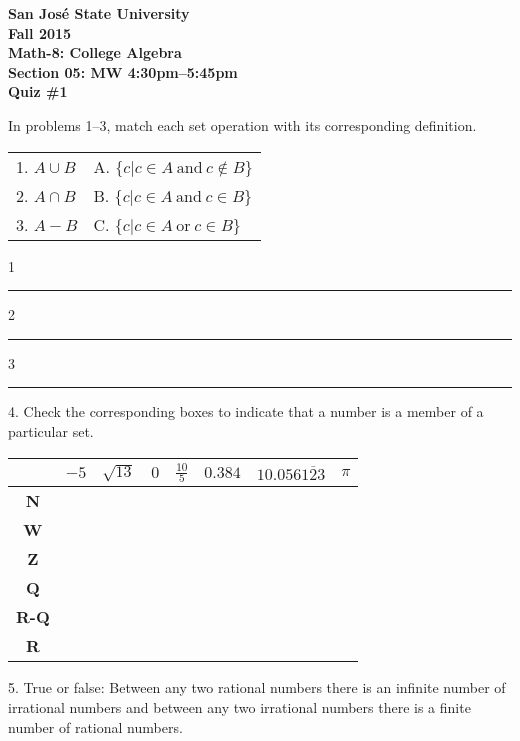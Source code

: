 \documentclass[letterpaper, 12pt]{article}
\begin{document}
\begin{center}
\bfseries
San Jos\'{e} State University \\
Fall 2015 \\
Math-8: College Algebra \\
Section 05: MW 4:30pm--5:45pm \\
\bigskip
Quiz \#1
\end{center}

\bigskip

In problems 1--3, match each set operation with its corresponding definition.

\bigskip

\begin{tabular}{p{2in}l}
1. $A \cup B$ & A. $\{c | c \in A\ \mbox{and}\ c \notin B\}$ \\
2. $A \cap B$ & B. $\{c | c \in A\ \mbox{and}\ c \in B\}$ \\
3. $A - B$ & C. $\{c | c \in A\ \mbox{or}\ c \in B\}$
\end{tabular}

\bigskip

1 \rule{1in}{1pt}

2 \rule{1in}{1pt}

3 \rule{1in}{1pt}

\vspace{0.5in}

4. Check the corresponding boxes to indicate that a number is a member of a
particular set.

\bigskip

\begin{tabular}{|c|c|c|c|c|c|c|c|}
\hline
& $-5$ & $\sqrt{13}$ & $0$ & $\frac{10}{5}$ & $0.384$ & $10.056\overline{123}$
  & $\pi$ \\
\hline
\textbf{N} & & & & & & & \\
\hline
\textbf{W} & & & & & & & \\
\hline
\textbf{Z} & & & & & & & \\
\hline
\textbf{Q} & & & & & & & \\
\hline
\textbf{R-Q} & & & & & & & \\
\hline
\textbf{R} & & & & & & & \\
\hline
\end{tabular}

\vspace{0.5in}

5. True or false: Between any two rational numbers there is an infinite number
of irrational numbers and between any two irrational numbers there is a finite
number of rational numbers.
\end{document}
